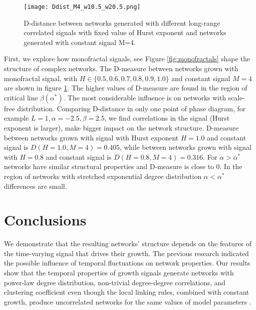 \begin{figure}[h!]
	\centering
	\texttt{[image: Ddist\_M4\_w10.5\_w20.5.png]}
	\caption{D-distance between networks generated with different long-range correlated signals with fixed value of Hurst exponent and networks generated with constant signal M=4.}
	\label{fig:Ddist_m}
\end{figure}

First, we explore how monofractal signals, see Figure \ref{fig:monofractals} shape the structure of complex networks. The D-measure between networks grown with monofractal signal, with $H \in \{0.5, 0.6, 0.7, 0.8, 0.9, 1.0\}$ and constant signal $M=4$ are shown in figure \ref{fig:Ddist_m}. The higher values of D-measure are found in the region of critical line $\beta(\alpha^{*})$. The most considerable influence is on networks with scale-free distribution. Comparing D-distance in only one point of  phase diagram, for example $L=1, \alpha = -2.5, \beta = 2.5$, we find correlations in the signal (Hurst exponent is larger), make bigger impact on the network structure. D-measure between networks grown with signal with Hurst exponent $H=1.0$ and constant signal is $D(H=1.0, M=4) = 0.405$, while between networks grown with signal with $H=0.8$ and constant signal is $D(H=0.8, M=4) = 0.316$. For $\alpha>\alpha^{*}$ networks have similar structural properties and D-measure is close to 0. In the region of networks with stretched exponential degree distribution $\alpha<\alpha^{*}$  differences are small.  




\section{Conclusions}

We demonstrate that the resulting networks' structure depends on the features of the time-varying signal that drives their growth. The previous research \cite{mitrovic2012,mitrovic2015} indicated the possible influence of temporal fluctuations on network properties. Our results show that the temporal properties of growth signals generate networks with power-law degree distribution, non-trivial degree-degree correlations, and clustering coefficient even though the local linking rules, combined with constant growth, produce uncorrelated networks for the same values of model parameters \cite{hajra2004}. 


